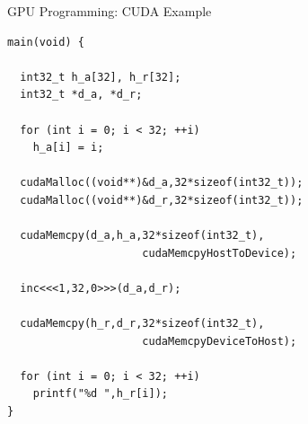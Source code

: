 \documentclass[xcolor=dvipsnames]{beamer}
\begin{document}
%
\begin{frame}[fragile]{GPU Programming: CUDA Example}

\begin{block}{}
\begin{tiny}
\begin{verbatim} 
main(void) {
  
  int32_t h_a[32], h_r[32]; 
  int32_t *d_a, *d_r;
  
  for (int i = 0; i < 32; ++i) 
    h_a[i] = i;

  cudaMalloc((void**)&d_a,32*sizeof(int32_t));
  cudaMalloc((void**)&d_r,32*sizeof(int32_t));

  cudaMemcpy(d_a,h_a,32*sizeof(int32_t),
                     cudaMemcpyHostToDevice);
  
  inc<<<1,32,0>>>(d_a,d_r); 

  cudaMemcpy(h_r,d_r,32*sizeof(int32_t),
                     cudaMemcpyDeviceToHost);

  for (int i = 0; i < 32; ++i) 
    printf("%d ",h_r[i]);
}
\end{verbatim}
\end{tiny}
\end{block} 
\end{frame} 
\end{document}
